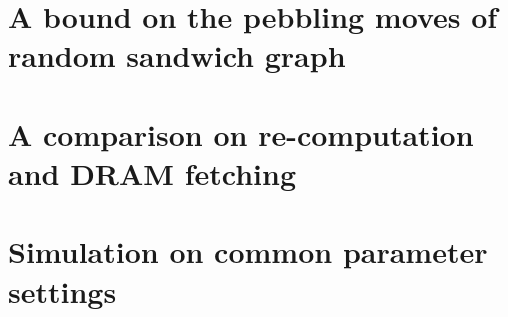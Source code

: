 \documentclass[a4paper, oneside]{article}
\begin{document}
\section{A bound on the pebbling moves of random sandwich graph}

\section{A comparison on re-computation and DRAM fetching}

\section{Simulation on common parameter settings}




\end{document}
